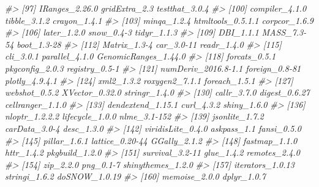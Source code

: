 \documentclass[]{article}
\newcommand{\hlcom}[1]{\textcolor[rgb]{0.502,0.502,0.502}{\textit{#1}}}%
\newenvironment{Shaded}{\begin{myshaded}}{\end{myshaded}}
\newcommand{\CommentTok}[1]{\hlcom{#1}}
\begin{document}
\begin{Shaded}
\begin{Highlighting}[]
\CommentTok{\#\textgreater{}  [97] IRanges\_2.26.0              gridExtra\_2.3               testthat\_3.0.4             }
\CommentTok{\#\textgreater{} [100] compiler\_4.1.0              tibble\_3.1.2                crayon\_1.4.1               }
\CommentTok{\#\textgreater{} [103] minqa\_1.2.4                 htmltools\_0.5.1.1           corpcor\_1.6.9              }
\CommentTok{\#\textgreater{} [106] later\_1.2.0                 snow\_0.4{-}3                  tidyr\_1.1.3                }
\CommentTok{\#\textgreater{} [109] DBI\_1.1.1                   MASS\_7.3{-}54                 boot\_1.3{-}28                }
\CommentTok{\#\textgreater{} [112] Matrix\_1.3{-}4                car\_3.0{-}11                  readr\_1.4.0                }
\CommentTok{\#\textgreater{} [115] cli\_3.0.1                   parallel\_4.1.0              GenomicRanges\_1.44.0       }
\CommentTok{\#\textgreater{} [118] forcats\_0.5.1               pkgconfig\_2.0.3             registry\_0.5{-}1             }
\CommentTok{\#\textgreater{} [121] numDeriv\_2016.8{-}1.1         foreign\_0.8{-}81              plotly\_4.9.4.1             }
\CommentTok{\#\textgreater{} [124] xml2\_1.3.2                  roxygen2\_7.1.1              foreach\_1.5.1              }
\CommentTok{\#\textgreater{} [127] webshot\_0.5.2               XVector\_0.32.0              stringr\_1.4.0              }
\CommentTok{\#\textgreater{} [130] callr\_3.7.0                 digest\_0.6.27               cellranger\_1.1.0           }
\CommentTok{\#\textgreater{} [133] dendextend\_1.15.1           curl\_4.3.2                  shiny\_1.6.0                }
\CommentTok{\#\textgreater{} [136] nloptr\_1.2.2.2              lifecycle\_1.0.0             nlme\_3.1{-}152               }
\CommentTok{\#\textgreater{} [139] jsonlite\_1.7.2              carData\_3.0{-}4               desc\_1.3.0                 }
\CommentTok{\#\textgreater{} [142] viridisLite\_0.4.0           askpass\_1.1                 fansi\_0.5.0                }
\CommentTok{\#\textgreater{} [145] pillar\_1.6.1                lattice\_0.20{-}44             GGally\_2.1.2               }
\CommentTok{\#\textgreater{} [148] fastmap\_1.1.0               httr\_1.4.2                  pkgbuild\_1.2.0             }
\CommentTok{\#\textgreater{} [151] survival\_3.2{-}11             glue\_1.4.2                  remotes\_2.4.0              }
\CommentTok{\#\textgreater{} [154] zip\_2.2.0                   png\_0.1{-}7                   shinythemes\_1.2.0          }
\CommentTok{\#\textgreater{} [157] iterators\_1.0.13            stringi\_1.6.2               doSNOW\_1.0.19              }
\CommentTok{\#\textgreater{} [160] memoise\_2.0.0               dplyr\_1.0.7}
\end{Highlighting}
\end{Shaded}
\end{document}
